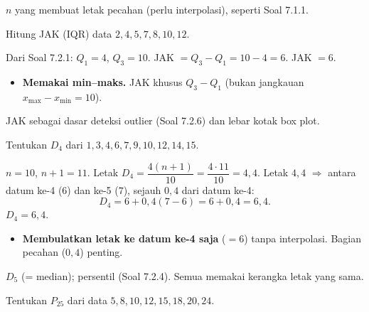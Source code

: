 \begin{variasi}
$n$ yang membuat letak pecahan (perlu interpolasi), seperti Soal 7.1.1.
\end{variasi}

\begin{soalbox}{}
Hitung JAK (IQR) data $2,4,5,7,8,10,12$.
\end{soalbox}

\jawab
{} Dari Soal 7.2.1: $Q_1=4$, $Q_3=10$.
 JAK $=Q_3-Q_1=10-4=6$.
\jadi JAK $=6$.

\begin{jebakan}
\begin{itemize}[leftmargin=*,topsep=2pt]
  \item \textbf{Memakai min--maks.} JAK khusus $Q_3-Q_1$ (bukan jangkauan
  $x_{\max}-x_{\min}=10$).
\end{itemize}
\end{jebakan}

\begin{variasi}
JAK sebagai dasar deteksi outlier (Soal 7.2.6) dan lebar kotak box plot.
\end{variasi}

\begin{soalbox}{}
Tentukan $D_4$ dari $1,3,4,6,7,9,10,12,14,15$.
\end{soalbox}

\jawab
{} $n=10$, $n+1=11$. Letak $D_4=\dfrac{4(n+1)}{10}=\dfrac{4\cdot11}{10}
=4{,}4$.
 Letak $4{,}4$ $\Rightarrow$ antara datum ke-4 ($6$) dan ke-5 ($7$),
sejauh $0{,}4$ dari datum ke-4:
\[
D_4=6+0{,}4(7-6)=6+0{,}4=6{,}4.
\]
\jadi $D_4=6{,}4$.

\begin{jebakan}
\begin{itemize}[leftmargin=*,topsep=2pt]
  \item \textbf{Membulatkan letak ke datum ke-4 saja} ($=6$) tanpa interpolasi.
  Bagian pecahan ($0{,}4$) penting.
\end{itemize}
\end{jebakan}

\begin{variasi}
$D_5$ (= median); persentil (Soal 7.2.4). Semua memakai kerangka letak yang sama.
\end{variasi}

\begin{soalbox}{}
Tentukan $P_{25}$ dari data $5,8,10,12,15,18,20,24$.
\end{soalbox}

